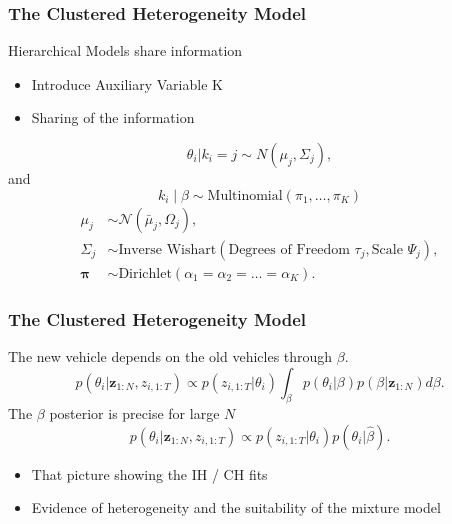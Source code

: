 \documentclass[8pt]{beamer}\usepackage[]{graphicx}\usepackage[]{color}
\begin{document}
\begin{frame}
\frametitle{The Clustered Heterogeneity Model}
Hierarchical Models share information 
\begin{itemize}
\item Introduce Auxiliary Variable K
\item Sharing of the information
\end{itemize}
\begin{equation}
\label{mixPrior}
\theta_i | k_i = j \sim N(\mu_j, \Sigma_j),
\end{equation}
and
\begin{equation}
k_i \mid \beta \sim \mbox{Multinomial}\left(\pi_1, \dots, \pi_{K}\right)
\end{equation}
\begin{align}
\mu_j &\sim \mathcal{N}\left(\bar{\mu}_j, \Omega_j\right), \\
\Sigma_j &\sim \mbox{Inverse Wishart}\left(\mbox{Degrees of Freedom } \tau_j, \mbox{Scale } \Psi_j\right), \\
\boldsymbol{\pi} &\sim \mbox{Dirichlet}\left(\alpha_1 = \alpha_2 = \dots = \alpha_K\right).
\end{align}
\end{frame}

\begin{frame}
\frametitle{The Clustered Heterogeneity Model}
The new vehicle depends on the old vehicles through $\beta$.
\begin{equation}
\label{hierNewCar}
p(\theta_{i} | \textbf{z}_{1:N}, z_{i, 1:T}) \propto p(z_{i, 1:T} | \theta_{i}) \int_{\beta} p(\theta_{i} | \beta) p (\beta | \textbf{z}_{1:N}) d\beta.
\end{equation}
The $\beta$ posterior is precise for large $N$
\begin{equation}
\label{hierNewCar2}
p(\theta_{i} | \textbf{z}_{1:N}, z_{i, 1:T}) \propto p(z_{i, 1:T} | \theta_{i}) p(\theta_{i} | \hat{\beta}).
\end{equation}
\end{frame}

\begin{frame}
\begin{itemize}
\item That picture showing the IH / CH fits
\item Evidence of heterogeneity and the suitability of the mixture model
\end{itemize}
\end{frame}
\end{document}
